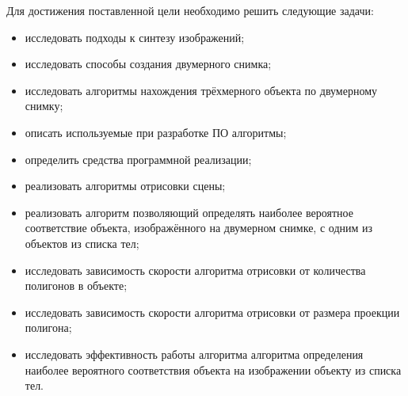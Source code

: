 Для достижения поставленной цели необходимо решить следующие задачи:
\begin{itemize}
	\item исследовать подходы к синтезу изображений;
	\item исследовать способы создания двумерного снимка;
	\item исследовать алгоритмы нахождения трёхмерного объекта по двумерному снимку;
	\item описать используемые при разработке ПО алгоритмы;
	\item определить средства программной реализации;
	\item реализовать алгоритмы отрисовки сцены;
	\item реализовать алгоритм позволяющий определять наиболее вероятное соответствие объекта, изображённого на двумерном снимке, с одним из объектов из списка тел;
	\item исследовать зависимость скорости алгоритма отрисовки от количества полигонов в объекте;
	\item исследовать зависимость скорости алгоритма отрисовки от размера проекции полигона;
	\item исследовать эффективность работы алгоритма алгоритма определения наиболее вероятного соответствия объекта на изображении объекту из списка тел.
\end{itemize}
